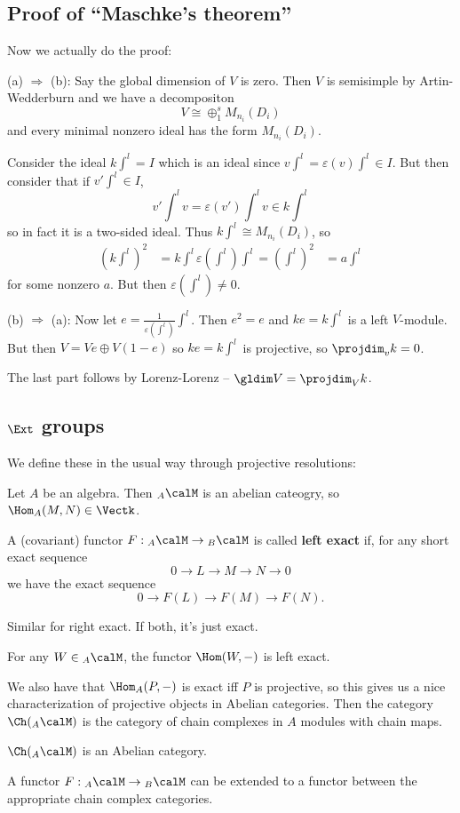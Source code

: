\documentclass[12pt]{article}
\begin{document}
\subsection{Proof of ``Maschke's theorem''}
Now we actually do the proof:
\begin{prf}
	(a) $\Rightarrow$ (b): Say the global dimension of $V$ is zero. Then $V$ is semisimple by Artin-Wedderburn and we have a decompositon
	\[V\cong \oplus_1^s M_{n_i}(D_i)\]
	and every minimal nonzero ideal has the form $M_{n_i}(D_i)$.

	Consider the ideal $k\int^l=I$ which is an ideal since $v\int^l=\varepsilon(v)\int^l\in I$. But then consider that if $v'\int^l\in I$, 
	\[v'\int^l v=\varepsilon(v')\int^l v\in k\int^l\]
	so in fact it is a two-sided ideal. Thus $k\int^l\cong M_{n_i}(D_i)$, so 
	\begin{align*}
		(k\int^l)^2&=k\int^l
		\varepsilon(\int^l)\int^l=(\int^l)^2&=a\int^l
	\end{align*}
	for some nonzero $a$. But then $\varepsilon(\int^l)\ne 0$.

	(b) $\Rightarrow$ (a): Now let $e=\frac{1}{\varepsilon(\int^l)}\int^l$. Then $e^2=e$ and $ke=k\int^l$ is a left $V$-module.
	But then $V=Ve\oplus V(1-e)$ so $ke=k\int^l$ is projective, so $\projdim_v k=0$.

	The last part follows by Lorenz-Lorenz -- $\gldim V=\projdim_V k$.
\end{prf}

\subsection{$\Ext$ groups}
We define these in the usual way through projective resolutions:

Let $A$ be an algebra. Then $_A\calM$ is an abelian cateogry, so $\Hom_A(M,N)\in\Vectk$.
\begin{defn}
	A (covariant) functor $F:{_A\calM}\to{_B\calM}$ is called \textbf{left exact} if, for any short exact sequence
	\[0\to L\to M\to N\to 0\]
	we have the exact sequence
	\[0\to F(L)\to F(M)\to F(N).\]

	Similar for right exact. If both, it's just exact.
\end{defn}
\begin{lem}
	For any $W\in{_A\calM}$, the functor $\Hom(W,-)$ is left exact.
\end{lem}
We also have that $\Hom_A(P,-)$ is exact iff $P$ is projective, so this gives us a nice characterization of projective objects in Abelian categories.
Then the category $\Ch({_A\calM})$ is the category of chain complexes in $A$ modules with chain maps.
\begin{lem}
	$\Ch({_A\calM})$ is an Abelian category.
\end{lem}
\begin{lem}
	A functor $F:{_A\calM}\to{_B\calM}$ can be extended to a functor between the appropriate chain complex categories.
\end{lem}
\end{document}
